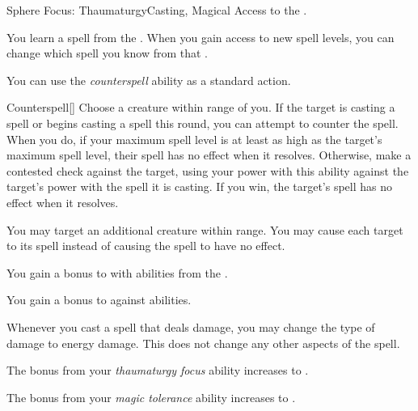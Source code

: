     \begin{feat}{Sphere Focus: Thaumaturgy}{Casting, Magical}
        \featpre Access to the  .

         You learn a spell from the  .
        When you gain access to new spell levels, you can change which spell you know from that .

         You can use the \textit{counterspell} ability as a standard action.
        \begin{freeability}{Counterspell}[]
            Choose a creature within \rngmed range of you.
            If the target is casting a spell or begins casting a spell this round, you can attempt to counter the spell.
            When you do, if your maximum spell level is at least as high as the target's maximum spell level, their spell has no effect when it resolves.
            Otherwise, make a contested  check against the target, using your power with this ability against the target's power with the spell it is casting.
            If you win, the target's spell has no effect when it resolves.

            \rankline
             You may target an additional creature within range.
             You may cause each target to  its spell instead of causing the spell to have no effect.
        \end{freeability}

         You gain a  bonus to  with abilities from the  .

         You gain a  bonus to  against  abilities.

         Whenever you cast a spell that deals damage, you may change the type of damage to energy damage.
        This does not change any other aspects of the spell.

         The bonus from your \textit{thaumaturgy focus} ability increases to .

         The bonus from your \textit{magic tolerance} ability increases to .
    \end{feat}

